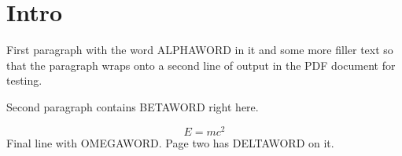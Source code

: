 \documentclass{article}
\begin{document}
\section{Intro}
First paragraph with the word ALPHAWORD in it and some more filler text so that the
paragraph wraps onto a second line of output in the PDF document for testing.

Second paragraph contains BETAWORD right here.

\begin{equation}
  E = mc^2 \label{eq:1}
\end{equation}
Final line with OMEGAWORD.
\newpage
Page two has DELTAWORD on it.
\end{document}
